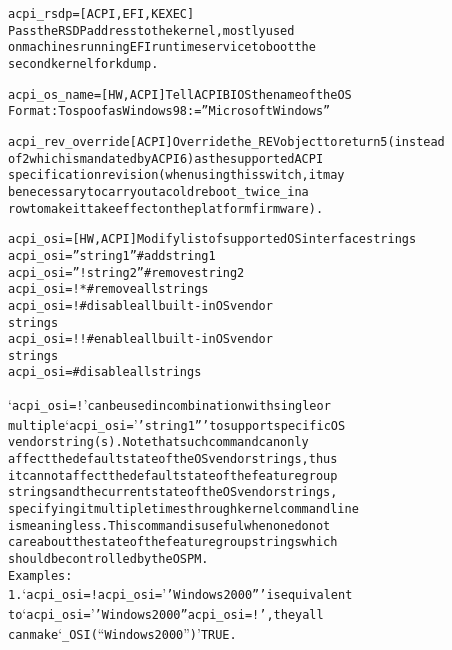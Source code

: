 \documentclass[a4paper,8pt,english]{sphinxmanual}
\begin{document}
\begin{alltt}
        acpi\_rsdp=      {[}ACPI,EFI,KEXEC{]}
                        Pass the RSDP address to the kernel, mostly used
                        on machines running EFI runtime service to boot the
                        second kernel for kdump.

        acpi\_os\_name=   {[}HW,ACPI{]} Tell ACPI BIOS the name of the OS
                        Format: To spoof as Windows 98: =''Microsoft Windows''

        acpi\_rev\_override {[}ACPI{]} Override the \_REV object to return 5 (instead
                        of 2 which is mandated by ACPI 6) as the supported ACPI
                        specification revision (when using this switch, it may
                        be necessary to carry out a cold reboot \_twice\_ in a
                        row to make it take effect on the platform firmware).

        acpi\_osi=       {[}HW,ACPI{]} Modify list of supported OS interface strings
                        acpi\_osi=''string1''      \# add string1
                        acpi\_osi=''!string2''     \# remove string2
                        acpi\_osi=!*             \# remove all strings
                        acpi\_osi=!              \# disable all built-in OS vendor
                                                  strings
                        acpi\_osi=!!             \# enable all built-in OS vendor
                                                  strings
                        acpi\_osi=               \# disable all strings

                        `acpi\_osi=!' can be used in combination with single or
                        multiple `acpi\_osi=''string1''' to support specific OS
                        vendor string(s).  Note that such command can only
                        affect the default state of the OS vendor strings, thus
                        it cannot affect the default state of the feature group
                        strings and the current state of the OS vendor strings,
                        specifying it multiple times through kernel command line
                        is meaningless.  This command is useful when one do not
                        care about the state of the feature group strings which
                        should be controlled by the OSPM.
                        Examples:
                          1. `acpi\_osi=! acpi\_osi=''Windows 2000''' is equivalent
                             to `acpi\_osi=''Windows 2000'' acpi\_osi=!', they all
                             can make `\_OSI(``Windows 2000'')' TRUE.


\end{alltt}
\end{document}

